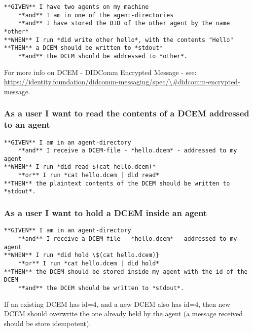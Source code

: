 \begin{lstlisting}
**GIVEN** I have two agents on my machine
    **and** I am in one of the agent-directories
    **and** I have stored the DID of the other agent by the name *other*
**WHEN** I run *did write other hello*, with the contents "Hello"
**THEN** a DCEM should be written to *stdout*
    **and** the DCEM should be addressed to *other*.
\end{lstlisting}

For more info on DCEM - DIDComm Encrypted Message - see:
\href{https://identity.foundation/didcomm-messaging/spec/\%5C\%5C\#didcomm-encrypted-message}{https://identity.foundation/didcomm-messaging/spec/\textbackslash\#didcomm-encrypted-message}.

\hypertarget{as-a-user-i-want-to-read-the-contents-of-a-dcem-addressed-to-an-agent}{%
\subsubsection{As a user I want to read the contents of a DCEM addressed
to an
agent}\label{as-a-user-i-want-to-read-the-contents-of-a-dcem-addressed-to-an-agent}}

\begin{lstlisting}
**GIVEN** I am in an agent-directory
    **and** I receive a DCEM-file - *hello.dcem* - addressed to my agent
**WHEN** I run *did read $(cat hello.dcem)*
    **or** I run *cat hello.dcem | did read*
**THEN** the plaintext contents of the DCEM should be written to *stdout*.
\end{lstlisting}

\hypertarget{as-a-user-i-want-to-hold-a-dcem-inside-an-agent}{%
\subsubsection{As a user I want to hold a DCEM inside an
agent}\label{as-a-user-i-want-to-hold-a-dcem-inside-an-agent}}

\begin{lstlisting}
**GIVEN** I am in an agent-directory
    **and** I receive a DCEM-file - *hello.dcem* - addressed to my agent
**WHEN** I run *did hold \$(cat hello.dcem)}
    **or** I run *cat hello.dcem | did hold*
**THEN** the DCEM should be stored inside my agent with the id of the DCEM
    **and** the DCEM should be written to *stdout*.
\end{lstlisting}

If an existing DCEM has id=4, and a new DCEM also has id=4, then new
DCEM should overwrite the one already held by the agent (a message
received should be store idempotent).


